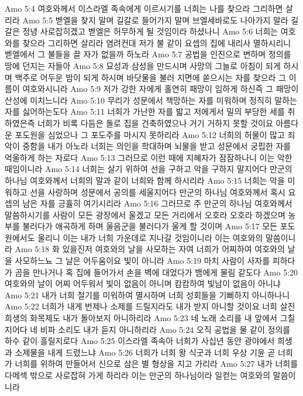 Amo 5:4  여호와께서 이스라엘 족속에게 이르시기를 너희는 나를 찾으라 그리하면 살리라
Amo 5:5  벧엘을 찾지 말며 길갈로 들어가지 말며 브엘세바로도 나아가지 말라 길갈은 정녕 사로잡히겠고 벧엘은 허무하게 될 것임이라 하셨나니
Amo 5:6  너희는 여호와를 찾으라 그리하면 살리라 염려컨대 저가 불 같이 요셉의 집에 내리사 멸하시리니 벧엘에서 그 불들을 끌 자가 없을까 하노라
Amo 5:7  공법을 인진으로 변하며 정의를 땅에 던지는 자들아
Amo 5:8  묘성과 삼성을 만드시며 사망의 그늘로 아침이 되게 하시며 백주로 어두운 밤이 되게 하시며 바닷물을 불러 지면에 쏟으시는 자를 찾으라 그 이름이 여호와시니라
Amo 5:9  저가 강한 자에게 홀연히 패망이 임하게 하신즉 그 패망이 산성에 미치느니라
Amo 5:10  무리가 성문에서 책망하는 자를 미워하며 정직히 말하는 자를 싫어하는도다
Amo 5:11  너희가 가난한 자를 밟고 저에게서 밀의 부당한 세를 취하였은즉 너희가 비록 다듬은 돌로 집을 건축하였으나 거기 거하지 못할 것이요 아름다운 포도원을 심었으나 그 포도주를 마시지 못하리라
Amo 5:12  너희의 허물이 많고 죄악이 중함을 내가 아노라 너희는 의인을 학대하며 뇌물을 받고 성문에서 궁핍한 자를 억울하게 하는 자로다
Amo 5:13  그러므로 이런 때에 지혜자가 잠잠하나니 이는 악한 때임이니라
Amo 5:14  너희는 살기 위하여 선을 구하고 악을 구하지 말지어다 만군의 하나님 여호와께서 너희의 말과 같이 너희와 함께 하시리라
Amo 5:15  너희는 악을 미워하고 선을 사랑하며 성문에서 공의를 세울지어다 만군의 하나님 여호와께서 혹시 요셉의 남은 자를 긍휼히 여기시리라
Amo 5:16  그러므로 주 만군의 하나님 여호와께서 말씀하시기를 사람이 모든 광장에서 울겠고 모든 거리에서 오호라 오호라 하겠으며 농부를 불러다가 애곡하게 하며 울음군을 불러다가 울게 할 것이며
Amo 5:17  모든 포도원에서도 울리니 이는 내가 너희 가운데로 지나갈 것임이니라 이는 여호와의 말씀이니라
Amo 5:18  화 있을진저 여호와의 날을 사모하는 자여 너희가 어찌하여 여호와의 날을 사모하느뇨 그 날은 어두움이요 빛이 아니라
Amo 5:19  마치 사람이 사자를 피하다가 곰을 만나거나 혹 집에 들어가서 손을 벽에 대었다가 뱀에게 물림 같도다
Amo 5:20  여호와의 날이 어찌 어두워서 빛이 없음이 아니며 캄캄하여 빛남이 없음이 아니냐
Amo 5:21  내가 너희 절기를 미워하여 멸시하며 너희 성회들을 기뻐하지 아니하나니
Amo 5:22  너희가 내게 번제나 소제를 드릴지라도 내가 받지 아니할 것이요 너희 살진 희생의 화목제도 내가 돌아보지 아니하리라
Amo 5:23  네 노래 소리를 내 앞에서 그칠지어다 네 비파 소리도 내가 듣지 아니하리라
Amo 5:24  오직 공법을 물 같이 정의를 하수 같이 흘릴지로다
Amo 5:25  이스라엘 족속아 너희가 사십년 동안 광야에서 희생과 소제물을 내게 드렸느냐
Amo 5:26  너희가 너희 왕 식굿과 너희 우상 기윤 곧 너희가 너희를 위하여 만들어서 신으로 삼은 별 형상을 지고 가리라
Amo 5:27  내가 너희를 다메섹 밖으로 사로잡혀 가게 하리라 이는 만군의 하나님이라 일컫는 여호와의 말씀이니라
